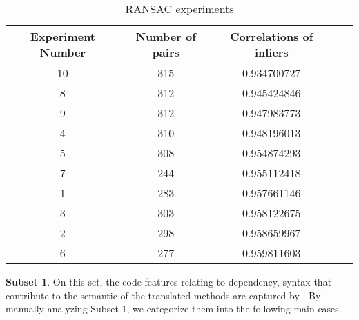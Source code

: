
\begin{table}
	\caption{RANSAC experiments}
	\begin{tabular}{|c|c|c|c|c|}
		\hline
		Experiment Number & Number of pairs & Correlations of inliers \\
		\hline
		10	& 315	& 0.934700727 \\		
		8	& 312	& 0.945424846 \\	
		9	& 312	& 0.947983773 \\
		4	& 310	& 0.948196013 \\
		{\cellcolor[gray]{.8}}5	& {\cellcolor[gray]{.8}}308	& {\cellcolor[gray]{.8}}0.954874293 \\
		7	& 244	& 0.955112418 \\	
		1	& 283	& 0.957661146 \\
		3	& 303	& 0.958122675 \\
		2	& 298	& 0.958659967 \\
		6	& 277	& 0.959811603 \\		
		\hline
	\end{tabular}
	\label{table:RANSAC_experiments}
\end{table}

%



\textbf{Subset 1}. On this set, the code features relating to dependency, 
syntax that contribute to the semantic of the translated methods are 
captured by {\model}. By manually analyzing Subset 1, we 
categorize them into the following main cases.

